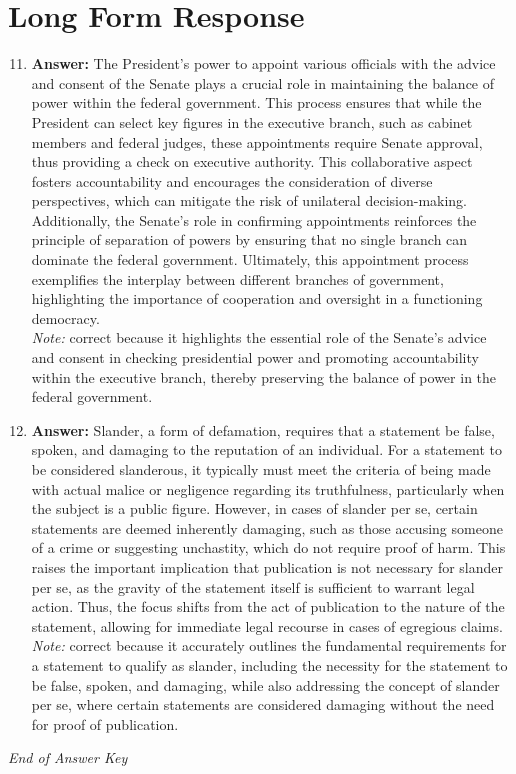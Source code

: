 \documentclass[12pt]{article}
\begin{document}
\section*{Long Form Response}
\begin{enumerate}[label=\arabic*.]
\setcounter{enumi}{10}
\item \textbf{Answer:} The President's power to appoint various officials with the advice and consent of the Senate plays a crucial role in maintaining the balance of power within the federal government. This process ensures that while the President can select key figures in the executive branch, such as cabinet members and federal judges, these appointments require Senate approval, thus providing a check on executive authority. This collaborative aspect fosters accountability and encourages the consideration of diverse perspectives, which can mitigate the risk of unilateral decision-making. Additionally, the Senate's role in confirming appointments reinforces the principle of separation of powers by ensuring that no single branch can dominate the federal government. Ultimately, this appointment process exemplifies the interplay between different branches of government, highlighting the importance of cooperation and oversight in a functioning democracy.
\\ \textit{Note:} correct because it highlights the essential role of the Senate's advice and consent in checking presidential power and promoting accountability within the executive branch, thereby preserving the balance of power in the federal government.
\item \textbf{Answer:} Slander, a form of defamation, requires that a statement be false, spoken, and damaging to the reputation of an individual. For a statement to be considered slanderous, it typically must meet the criteria of being made with actual malice or negligence regarding its truthfulness, particularly when the subject is a public figure. However, in cases of slander per se, certain statements are deemed inherently damaging, such as those accusing someone of a crime or suggesting unchastity, which do not require proof of harm. This raises the important implication that publication is not necessary for slander per se, as the gravity of the statement itself is sufficient to warrant legal action. Thus, the focus shifts from the act of publication to the nature of the statement, allowing for immediate legal recourse in cases of egregious claims.
\\ \textit{Note:} correct because it accurately outlines the fundamental requirements for a statement to qualify as slander, including the necessity for the statement to be false, spoken, and damaging, while also addressing the concept of slander per se, where certain statements are considered damaging without the need for proof of publication.
\end{enumerate}

\vfill
\noindent\textit{End of Answer Key}
\end{document}
